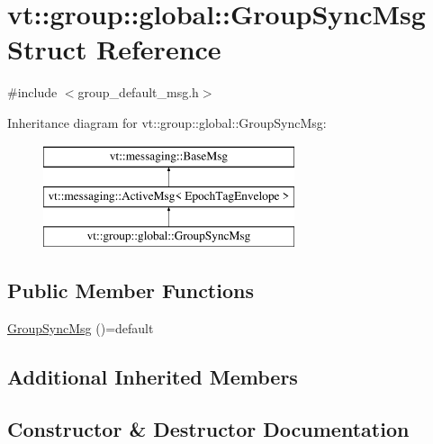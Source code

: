 \hypertarget{structvt_1_1group_1_1global_1_1_group_sync_msg}{}\section{vt\+:\+:group\+:\+:global\+:\+:Group\+Sync\+Msg Struct Reference}
\label{structvt_1_1group_1_1global_1_1_group_sync_msg}


{\ttfamily \#include $<$group\+\_\+default\+\_\+msg.\+h$>$}

Inheritance diagram for vt\+:\+:group\+:\+:global\+:\+:Group\+Sync\+Msg\+:\begin{figure}[H]
\begin{center}
\leavevmode
\includegraphics[height=3.000000cm]{structvt_1_1group_1_1global_1_1_group_sync_msg}
\end{center}
\end{figure}
\subsection*{Public Member Functions}
\begin{DoxyCompactItemize}
\item 
\hyperlink{structvt_1_1group_1_1global_1_1_group_sync_msg_a2ec5190af929cf9e0f8bc5f0564c28a0}{Group\+Sync\+Msg} ()=default
\end{DoxyCompactItemize}
\subsection*{Additional Inherited Members}


\subsection{Constructor \& Destructor Documentation}
\mbox{\label{structvt_1_1group_1_1global_1_1_group_sync_msg_a2ec5190af929cf9e0f8bc5f0564c28a0}} 
